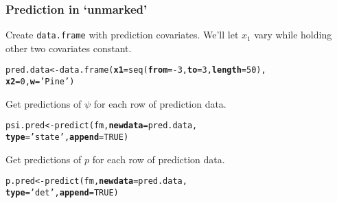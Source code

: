 \documentclass[color=usenames,dvipsnames]{beamer}\usepackage[]{graphicx}\usepackage[]{color}
\makeatletter
\newcommand{\hlnum}[1]{\textcolor[rgb]{0.69,0.494,0}{#1}}%
\newcommand{\hlstr}[1]{\textcolor[rgb]{0.749,0.012,0.012}{#1}}%
\newcommand{\hlopt}[1]{\textcolor[rgb]{0,0,0}{#1}}%
\newcommand{\hlstd}[1]{\textcolor[rgb]{0,0,0}{#1}}%
\newcommand{\hlkwb}[1]{\textcolor[rgb]{0,0.341,0.682}{#1}}%
\newcommand{\hlkwc}[1]{\textcolor[rgb]{0,0,0}{\textbf{#1}}}%
\newcommand{\hlkwd}[1]{\textcolor[rgb]{0.004,0.004,0.506}{#1}}%
\newenvironment{kframe}{%
 \def\at@end@of@kframe{}%
 \ifinner\ifhmode%
  \def\at@end@of@kframe{\end{minipage}}%
  \begin{minipage}{\columnwidth}%
 \fi\fi%
 \def\FrameCommand##1{\hskip\@totalleftmargin \hskip-\fboxsep
 \colorbox{shadecolor}{##1}\hskip-\fboxsep
     \hskip-\linewidth \hskip-\@totalleftmargin \hskip\columnwidth}%
 \MakeFramed {\advance\hsize-\width
   \@totalleftmargin\z@ \linewidth\hsize
   \@setminipage}}%
 {\par\unskip\endMakeFramed%
 \at@end@of@kframe}
\newenvironment{knitrout}{}{} %
\makeatother
\begin{document}
\begin{frame}[fragile]
  \frametitle{Prediction in `unmarked'}
  Create \texttt{data.frame} with prediction covariates. We'll let $x_1$
  vary while holding other two covariates constant.  
\begin{knitrout}\small
{}\color{fgcolor}\begin{kframe}
\begin{alltt}
\hlstd{pred.data} \hlkwb{<-} \hlkwd{data.frame}\hlstd{(}\hlkwc{x1}\hlstd{=}\hlkwd{seq}\hlstd{(}\hlkwc{from}\hlstd{=}\hlopt{-}\hlnum{3}\hlstd{,} \hlkwc{to}\hlstd{=}\hlnum{3}\hlstd{,} \hlkwc{length}\hlstd{=}\hlnum{50}\hlstd{),}
                        \hlkwc{x2}\hlstd{=}\hlnum{0}\hlstd{,} \hlkwc{w}\hlstd{=}\hlstr{'Pine'}\hlstd{)}
\end{alltt}
\end{kframe}
\end{knitrout}
\pause
\vfill
Get predictions of $\psi$ for each row of prediction data.
\begin{knitrout}\small
{}\color{fgcolor}\begin{kframe}
\begin{alltt}
\hlstd{psi.pred} \hlkwb{<-} \hlkwd{predict}\hlstd{(fm,} \hlkwc{newdata}\hlstd{=pred.data,}
                    \hlkwc{type}\hlstd{=}\hlstr{'state'}\hlstd{,} \hlkwc{append}\hlstd{=}\hlnum{TRUE}\hlstd{)}
\end{alltt}
\end{kframe}
\end{knitrout}
\pause
\vfill
Get predictions of $p$ for each row of prediction data.
\begin{knitrout}\small
{}\color{fgcolor}\begin{kframe}
\begin{alltt}
\hlstd{p.pred} \hlkwb{<-} \hlkwd{predict}\hlstd{(fm,} \hlkwc{newdata}\hlstd{=pred.data,}
                  \hlkwc{type}\hlstd{=}\hlstr{'det'}\hlstd{,} \hlkwc{append}\hlstd{=}\hlnum{TRUE}\hlstd{)}
\end{alltt}
\end{kframe}
\end{knitrout}
\end{frame}
\end{document}
